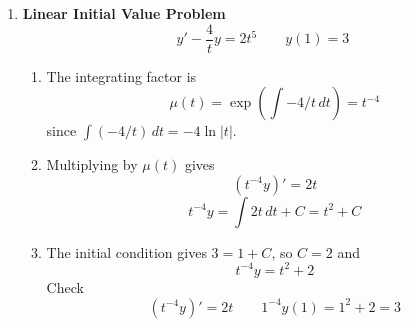 \documentclass[11pt,letterpaper]{article}
\begin{document}
\begin{enumerate}
\begin{enumerate}
\[\]
\end{enumerate}
\newpage
\item \textbf{Linear Initial Value Problem}
\[
y'-\frac{4}{t}y=2t^5
\qquad y(1)=3
\]
\begin{enumerate}
\item The integrating factor is
\[
\mu(t)=\exp\left(\int\boxed{-4/t}\,dt\right)=\boxed{t^{-4}}
\]
since $\int(-4/t)\,dt=-4\ln|t|$.
\vfill
\item Multiplying by $\mu(t)$ gives
\[
(t^{-4}y)'=\boxed{2t}
\]
\[
t^{-4}y=\int\boxed{2t}\,dt+C=\boxed{t^2}+C
\]
\vfill
\item The initial condition gives
$3=1+C$, so $C=2$ and
\[
\boxed{t^{-4}y=t^2+2}
\]
Check
\[
(t^{-4}y)'=2t
\qquad 1^{-4}y(1)=1^2+2=3
\]
\end{enumerate}
\vfill
\end{enumerate}
\end{document}

